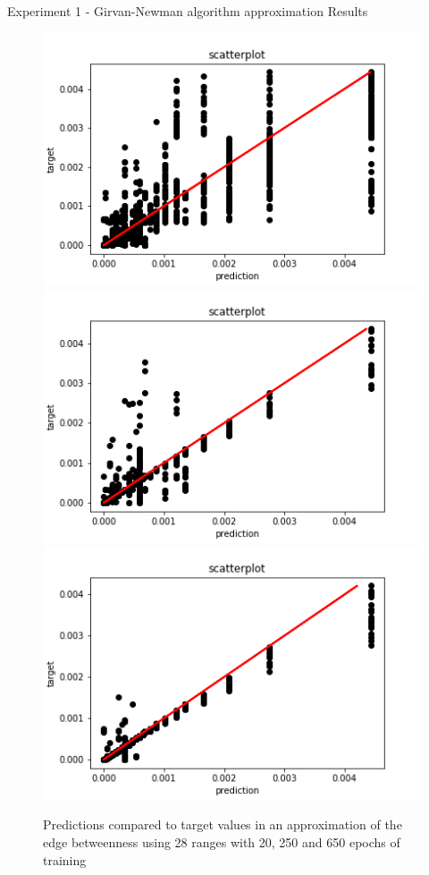 \documentclass[xcolor=table]{beamer}
\begin{document}
\begin{frame}{Experiment 1 - Girvan-Newman algorithm approximation }{ Results}


\begin{figure}[H]
%
  \centering
    \includegraphics[width=0.9\linewidth]{img/GN_exp1/28bins/scatter_plot_20epochs.png}
\endminipage
{}%
  \centering
    \includegraphics[width=0.9\linewidth]{img/GN_exp1/28bins/scatter_plot_250epochs.png}
\endminipage
{}%
  \centering
    \includegraphics[width=0.9\linewidth]{img/GN_exp1/28bins/scatter_plot_600epochs.png}
\endminipage
\caption{Predictions compared to target values in an approximation of the edge betweenness using 28 ranges with 20, 250 and 650 epochs of training}\label{fig:edgeb_exp1_20bins}
\end{figure}


\end{frame}
\end{document}
